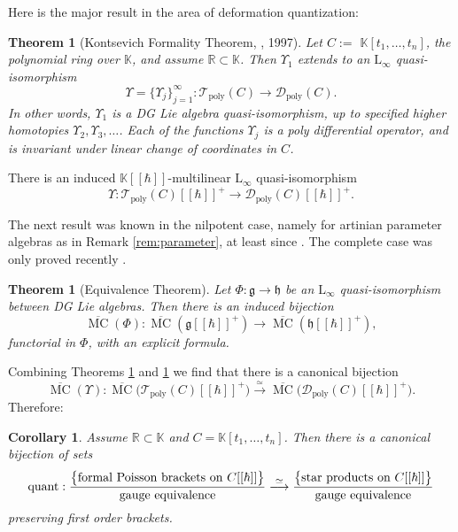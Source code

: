\documentclass{conm-p-l}
\newtheorem{thm}[equation]{Theorem}
\newtheorem{cor}[equation]{Corollary}
\theoremstyle{definition}
\numberwithin{equation}{section}
\newcommand{\ol}{\overline}
\newcommand{\iso}{\stackrel{\simeq}{\longrightarrow}}
\newcommand{\opn}{\operatorname}
\newcommand{\mfrak}[1]{\mathfrak{#1}}
\newcommand{\mcal}[1]{\mathcal{#1}}
\newcommand{\mrm}[1]{\mathrm{#1}}
\newcommand{\mbb}[1]{\mathbb{#1}}
\newcommand{\tup}[1]{\textup{#1}}
\newcommand{\K}{\mbb{K}}
\newcommand{\g}{\mfrak{g}}
\newcommand{\h}{\mfrak{h}}
\begin{document}
Here is the major result in the area of deformation quantization:

\begin{thm}[Kontsevich Formality Theorem, \cite{Ko1}, 1997] \label{thm:forma}
Let  $C :=$ \linebreak $\K[t_1, \ldots, t_n]$, the polynomial ring over $\K$,
and assume $\mbb{R} \subset \K$. Then $\Upsilon_1$ extends to an 
$\mrm{L}_{\infty}$ quasi-isomorphism
\[ \Upsilon = \{ \Upsilon_j \}_{j = 1}^{\infty} : 
\mcal{T}_{\mrm{poly}}(C) \to
\mcal{D}_{\mrm{poly}}(C) . \]
In other words, $\Upsilon_1$ is a DG Lie algebra 
quasi-isomorphism, up to specified higher homotopies 
$\Upsilon_2, \Upsilon_3, \ldots$. 
Each of the functions $\Upsilon_j$ is a poly differential operator, and is
invariant under linear change of coordinates in $C$.
\end{thm}

There is an induced $\K[[\hbar]]$-multilinear $\mrm{L}_{\infty}$
quasi-isomorphism
\begin{equation} \label{eqn:22}
\Upsilon : \mcal{T}_{\mrm{poly}}(C)[[\hbar]]^+ \to
\mcal{D}_{\mrm{poly}}(C)[[\hbar]]^+ . 
\end{equation}

The next result was known in the nilpotent case, namely for artinian parameter
algebras as in Remark \ref{rem:parameter}, at least since \cite {Ko1}.
The complete case was only proved recently \cite[Theorem 0.4]{Ye7}. 

\begin{thm}[Equivalence Theorem] \label{thm:equiv}
Let $\Phi : \g \to \h$ be an $\mrm{L}_{\infty}$ quasi-iso\-morphism between DG
Lie algebras. Then there is an induced bijection 
\[ \ol{\opn{MC}}(\Phi) : \ol{\opn{MC}}(\g[[\hbar]]^+) \to 
\ol{\opn{MC}}(\h[[\hbar]]^+) , \]
functorial in $\Phi$, with an explicit formula.
\end{thm}

Combining Theorems \ref{thm:forma} and \ref{thm:equiv} we find that there
is a canonical bijection
\[ \ol{\opn{MC}}(\Upsilon) : 
\ol{\opn{MC}} \bigl( \mcal{T}_{\mrm{poly}}(C)[[\hbar]]^+ \bigr) \iso
\ol{\opn{MC}} \bigl( \mcal{D}_{\mrm{poly}}(C)[[\hbar]]^+ \bigr) . \]
Therefore:

\begin{cor}
Assume  $\mbb{R} \subset \K$ and
$C = \K[t_1, \ldots, t_n]$. Then there is a canonical 
bijection of sets
\[ \opn{quant} : 
\frac{ \bigl\{ \tup{formal Poisson brackets on $C[[\hbar]]$}
\bigr\} }
{\tup{gauge equivalence}} \iso
\frac{ \bigl\{ \tup{star products on $C[[\hbar]]$} \bigr\} }
{\tup{gauge equivalence}} \]
preserving first order brackets. 
\end{cor}
\end{document}
